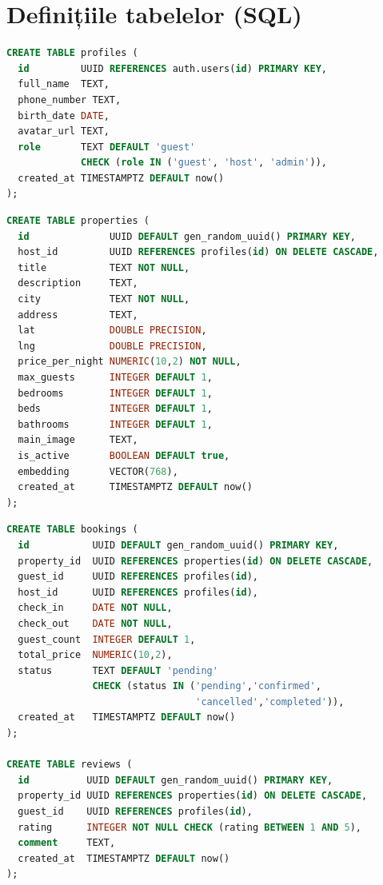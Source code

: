 \documentclass[12pt,a4paper,oneside]{report}
\begin{document}
\section{Definițiile tabelelor (SQL)}

\begin{lstlisting}[language=SQL, caption={Definirea tabelei profiles}]
CREATE TABLE profiles (
  id         UUID REFERENCES auth.users(id) PRIMARY KEY,
  full_name  TEXT,
  phone_number TEXT,
  birth_date DATE,
  avatar_url TEXT,
  role       TEXT DEFAULT 'guest'
             CHECK (role IN ('guest', 'host', 'admin')),
  created_at TIMESTAMPTZ DEFAULT now()
);
\end{lstlisting}

\begin{lstlisting}[language=SQL, caption={Definirea tabelei properties}]
CREATE TABLE properties (
  id              UUID DEFAULT gen_random_uuid() PRIMARY KEY,
  host_id         UUID REFERENCES profiles(id) ON DELETE CASCADE,
  title           TEXT NOT NULL,
  description     TEXT,
  city            TEXT NOT NULL,
  address         TEXT,
  lat             DOUBLE PRECISION,
  lng             DOUBLE PRECISION,
  price_per_night NUMERIC(10,2) NOT NULL,
  max_guests      INTEGER DEFAULT 1,
  bedrooms        INTEGER DEFAULT 1,
  beds            INTEGER DEFAULT 1,
  bathrooms       INTEGER DEFAULT 1,
  main_image      TEXT,
  is_active       BOOLEAN DEFAULT true,
  embedding       VECTOR(768),
  created_at      TIMESTAMPTZ DEFAULT now()
);
\end{lstlisting}

\begin{lstlisting}[language=SQL, caption={Definirea tabelelor bookings și reviews}]
CREATE TABLE bookings (
  id           UUID DEFAULT gen_random_uuid() PRIMARY KEY,
  property_id  UUID REFERENCES properties(id) ON DELETE CASCADE,
  guest_id     UUID REFERENCES profiles(id),
  host_id      UUID REFERENCES profiles(id),
  check_in     DATE NOT NULL,
  check_out    DATE NOT NULL,
  guest_count  INTEGER DEFAULT 1,
  total_price  NUMERIC(10,2),
  status       TEXT DEFAULT 'pending'
               CHECK (status IN ('pending','confirmed',
                                 'cancelled','completed')),
  created_at   TIMESTAMPTZ DEFAULT now()
);

CREATE TABLE reviews (
  id          UUID DEFAULT gen_random_uuid() PRIMARY KEY,
  property_id UUID REFERENCES properties(id) ON DELETE CASCADE,
  guest_id    UUID REFERENCES profiles(id),
  rating      INTEGER NOT NULL CHECK (rating BETWEEN 1 AND 5),
  comment     TEXT,
  created_at  TIMESTAMPTZ DEFAULT now()
);
\end{lstlisting}
\end{document}
